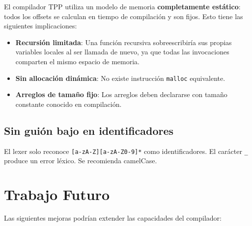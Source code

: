 El compilador TPP utiliza un modelo de memoria \textbf{completamente estático}: todos los offsets se calculan en tiempo de compilación y son fijos. Esto tiene las siguientes implicaciones:

\begin{itemize}
    \item \textbf{Recursión limitada}: Una función recursiva sobreescribiría sus propias variables locales al ser llamada de nuevo, ya que todas las invocaciones comparten el mismo espacio de memoria.
    \item \textbf{Sin allocación dinámica}: No existe instrucción \texttt{malloc} equivalente.
    \item \textbf{Arreglos de tamaño fijo}: Los arreglos deben declararse con tamaño constante conocido en compilación.
\end{itemize}

\subsection{Sin guión bajo en identificadores}

El lexer solo reconoce \texttt{[a-zA-Z][a-zA-Z0-9]*} como identificadores. El carácter \texttt{\_} produce un error léxico. Se recomienda camelCase.

\section{Trabajo Futuro}

Las siguientes mejoras podrían extender las capacidades del compilador:

